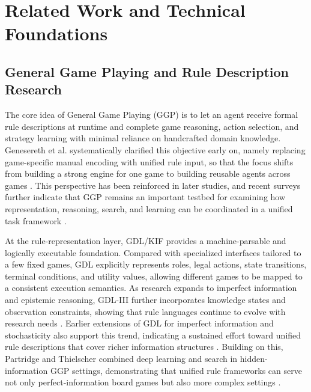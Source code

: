 ﻿%
\chapter{Related Work and Technical Foundations}
\setcounter{figure}{0}
\setcounter{equation}{0}
\renewcommand{\thefigure}{\thechapter-\arabic{figure}}
\renewcommand{\theequation}{\thechapter-\arabic{equation}}

\section{General Game Playing and Rule Description Research}

The core idea of General Game Playing (GGP) is to let an agent receive formal rule descriptions at runtime and complete game reasoning, action selection, and strategy learning with minimal reliance on handcrafted domain knowledge. Genesereth et al. systematically clarified this objective early on, namely replacing game-specific manual encoding with unified rule input, so that the focus shifts from building a strong engine for one game to building reusable agents across games \cite{genesereth2005general}. This perspective has been reinforced in later studies, and recent surveys further indicate that GGP remains an important testbed for examining how representation, reasoning, search, and learning can be coordinated in a unified task framework \cite{genesereth2026general}.

At the rule-representation layer, GDL/KIF provides a machine-parsable and logically executable foundation. Compared with specialized interfaces tailored to a few fixed games, GDL explicitly represents roles, legal actions, state transitions, terminal conditions, and utility values, allowing different games to be mapped to a consistent execution semantics. As research expands to imperfect information and epistemic reasoning, GDL-III further incorporates knowledge states and observation constraints, showing that rule languages continue to evolve with research needs \cite{thielscher2017gdl3}. Earlier extensions of GDL for imperfect information and stochasticity also support this trend, indicating a sustained effort toward unified rule descriptions that cover richer information structures \cite{thielscher2010incomplete}. Building on this, Partridge and Thielscher combined deep learning and search in hidden-information GGP settings, demonstrating that unified rule frameworks can serve not only perfect-information board games but also more complex settings \cite{partridge2022hidden}.

